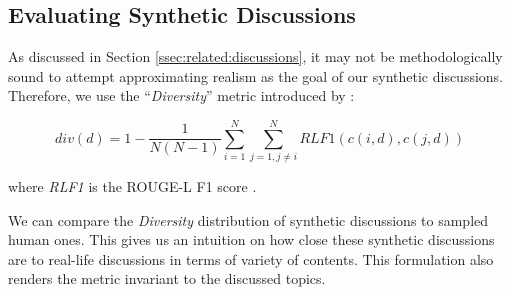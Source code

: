 




\subsection{Evaluating Synthetic Discussions}
\label{ssec:methodology:diversity}

As discussed in Section \ref{ssec:related:discussions}, it may not be methodologically sound to attempt approximating realism as the goal of our synthetic discussions. Therefore, we use the “\textit{Diversity}” metric introduced by \citet{ulmer2024}:

\small
\begin{equation}
\label{eq:variety}
    div(d) = 1- \frac{1}{N(N-1)} \sum_{i=1}^N \sum_{j=1, j \neq i}^N \textit{RLF1}(c(i, d), c(j, d))
\end{equation}
\normalsize

\noindent where \textit{RLF1} is the ROUGE-L F1 score \cite{lin-2004-rouge}.

We can compare the \textit{Diversity} distribution of synthetic discussions to sampled human ones. This gives us an intuition on how close these synthetic discussions are to real-life discussions in terms of variety of contents. This formulation also renders the metric invariant to the discussed topics.